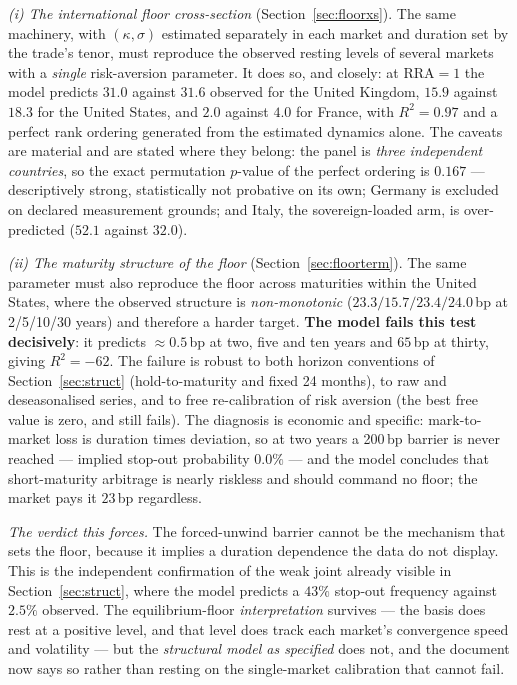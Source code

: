 \documentclass[11pt]{article}
\begin{document}
\emph{(i) The international floor cross-section} (Section~\ref{sec:floorxs}). The same machinery,
with $(\kappa,\sigma)$ estimated separately in each market and duration set by the trade's tenor,
must reproduce the observed resting levels of several markets with a \emph{single} risk-aversion
parameter. It does so, and closely: at $\mathrm{RRA}=1$ the model predicts $31.0$ against $31.6$
observed for the United Kingdom, $15.9$ against $18.3$ for the United States, and $2.0$ against
$4.0$ for France, with $R^{2}=0.97$ and a perfect rank ordering generated from the estimated
dynamics alone. The caveats are material and are stated where they belong: the panel is
\emph{three independent countries}, so the exact permutation $p$-value of the perfect ordering is
$0.167$ --- descriptively strong, statistically not probative on its own; Germany is excluded on
declared measurement grounds; and Italy, the sovereign-loaded arm, is over-predicted ($52.1$
against $32.0$).

\emph{(ii) The maturity structure of the floor} (Section~\ref{sec:floorterm}). The same parameter
must also reproduce the floor across maturities within the United States, where the observed
structure is \emph{non-monotonic} ($23.3/15.7/23.4/24.0$\,bp at 2/5/10/30 years) and therefore a
harder target. \textbf{The model fails this test decisively}: it predicts $\approx 0.5$\,bp at
two, five and ten years and $65$\,bp at thirty, giving $R^{2}=-62$. The failure is robust to both
horizon conventions of Section~\ref{sec:struct} (hold-to-maturity and fixed 24 months), to raw
and deseasonalised series, and to free re-calibration of risk aversion (the best free value is
zero, and still fails). The diagnosis is economic and specific: mark-to-market loss is duration
times deviation, so at two years a 200\,bp barrier is never reached --- implied stop-out
probability $0.0\%$ --- and the model concludes that short-maturity arbitrage is nearly riskless
and should command no floor; the market pays it $23$\,bp regardless.

\emph{The verdict this forces.} The forced-unwind barrier cannot be the mechanism that sets the
floor, because it implies a duration dependence the data do not display. This is the independent
confirmation of the weak joint already visible in Section~\ref{sec:struct}, where the model
predicts a $43\%$ stop-out frequency against $2.5\%$ observed. The equilibrium-floor
\emph{interpretation} survives --- the basis does rest at a positive level, and that level does
track each market's convergence speed and volatility --- but the \emph{structural model as
specified} does not, and the document now says so rather than resting on the single-market
calibration that cannot fail.
\end{document}

